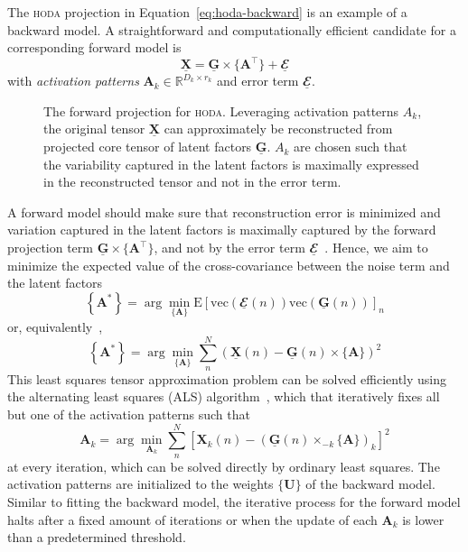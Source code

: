 \documentclass[twocolumn]{article}
\newcommand{\ten}[1]{\underline{\mathbf{#1}}} %
\newcommand{\mat}[1]{\mathbf{#1}} %
\newcommand{\mmpr}[1]{\times\{#1\}} %
\newcommand{\mmprs}[2]{\times_{-#2}\{#1\}} %
\begin{document}
The \textsc{hoda} projection in Equation~\ref{eq:hoda-backward} is an example
of a backward model.
A straightforward and computationally efficient candidate for a corresponding
forward model is
\begin{equation}
	\ten{X} = \ten{G}\mmpr{\mat{A}^\intercal} + \ten{\mathbfcal{E}}
	\label{eq:hoda-forward}
\end{equation}
with \textit{activation patterns} $\mat{A}_k \in \mathbb{R}^{D_k\times r_k}$
and error term $\ten{\mathbfcal{E}}$.
\begin{figure}
	\centering
	
	\caption{The forward projection for \textsc{hoda}. Leveraging activation
		patterns $A_k$, the original tensor $\ten{X}$ can approximately be
		reconstructed from projected core tensor of latent factors $\ten{G}$. $A_k$ are chosen such
		that the variability captured in the latent factors is maximally expressed in
		the reconstructed tensor and not in the error term.}
	\label{fig:hoda-forward}
\end{figure}

A forward model should make sure that reconstruction error is minimized and
variation captured in the latent factors is maximally captured by the forward
projection term $\ten{G}\mmpr{\mat{A}^\intercal}$, and not by the error term
$\ten{\mathbfcal{E}}$~\cite{Haufe2014}.
Hence, we aim to minimize the expected value of the cross-covariance between
the noise term and the latent factors
\begin{equation}
  \left\{\mat{A}^*\right\} = \arg\min_{\{\mat{A}\}}\text{E}\left[\text{vec}\left({\ten{\mathbfcal{E}}(n)}\right)\text{vec}\left({\ten{G}(n)}\right)\right]_n
\end{equation}
or, equivalently~\cite{Parra2005,Haufe2014},
\begin{equation}
  \left\{\mat{A}^*\right\} = \arg\min_{\{\mat{A}\}}\sum_n^N\left(\ten{X}(n) - \ten{G}(n)\mmpr{\mat{A}}\right)^2
\end{equation}
This least squares tensor approximation problem can be solved efficiently using the
alternating least squares (ALS) algorithm~\cite{Comon2009}, which that
iteratively fixes all but one of the activation patterns such that
\begin{equation}
  \mat{A}_k = \arg\min_{\mat{A}_k}
  \sum_n^N\left[\mat{X}_k(n) -
  \left(\ten{G}(n)\mmprs{\mat{A}}{k}\right)_k\right]^2
\end{equation}
at every iteration, which can be solved directly by ordinary least squares.
The activation patterns are initialized to the weights $\{\mat{U}\}$ of the
backward model.
Similar to fitting the backward model, the iterative process for the forward
model halts after a fixed amount of iterations or when the update of each
$\mat{A}_k$ is lower than a predetermined threshold.
\end{document}
